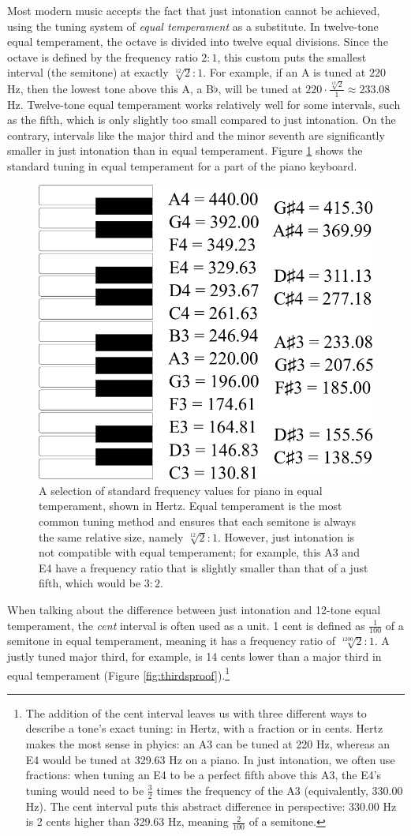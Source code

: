 \documentclass[a4paper]{article}
\begin{document}
Most modern music accepts the fact that just intonation cannot be achieved, using the tuning system of \textit{equal temperament} as a substitute. In twelve-tone equal temperament, the octave is divided into twelve equal divisions. Since the octave is defined by the frequency ratio $2:1$, this custom puts the smallest interval (the semitone) at exactly $\sqrt[12]{2}:1$. For example, if an A is tuned at $220$ Hz, then the lowest tone above this A, a B$\flat$, will be tuned at $220\cdot \frac{\sqrt[12]{2}}{1} \approx 233.08$ Hz.\cite{van_de_craats_fis_1989} Twelve-tone equal temperament works relatively well for some intervals, such as the fifth, which is only slightly too small compared to just intonation. On the contrary, intervals like the major third and the minor seventh are significantly smaller in just intonation than in equal temperament. Figure \ref{fig:12TET} shows the standard tuning in equal temperament for a part of the piano keyboard.

\begin{figure}
	\centering
	\includegraphics[width=0.5\linewidth]{Figures/12TET.pdf}
	\caption{A selection of standard frequency values for piano in equal temperament, shown in Hertz. Equal temperament is the most common tuning method and ensures that each semitone is always the same relative size, namely $\sqrt[12]{2}:1$. However, just intonation is not compatible with equal temperament; for example, this A3 and E4 have a frequency ratio that is slightly smaller than that of a just fifth, which would be $3:2$.}
	\label{fig:12TET}
\end{figure}

When talking about the difference between just intonation and 12-tone equal temperament, the \textit{cent} interval is often used as a unit. 1 cent is defined as $\frac{1}{100}$ of a semitone in equal temperament, meaning it has a frequency ratio of $\sqrt[1200]{2}:1$. A justly tuned major third, for example, is 14 cents lower than a major third in equal temperament (Figure \ref{fig:thirdsproof}).\footnote{The addition of the cent interval leaves us with three different ways to describe a tone's exact tuning: in Hertz, with a fraction or in cents. Hertz makes the most sense in phyics: an A3 can be tuned at 220 Hz, whereas an E4 would be tuned at 329.63 Hz on a piano. In just intonation, we often use fractions: when tuning an E4 to be a perfect fifth above this A3, the E4's tuning would need to be $\frac32$ times the frequency of the A3 (equivalently, 330.00 Hz). The cent interval puts this abstract difference in perspective: 330.00 Hz is 2 cents higher than 329.63 Hz, meaning $\frac{2}{100}$ of a semitone.}
\end{document}
